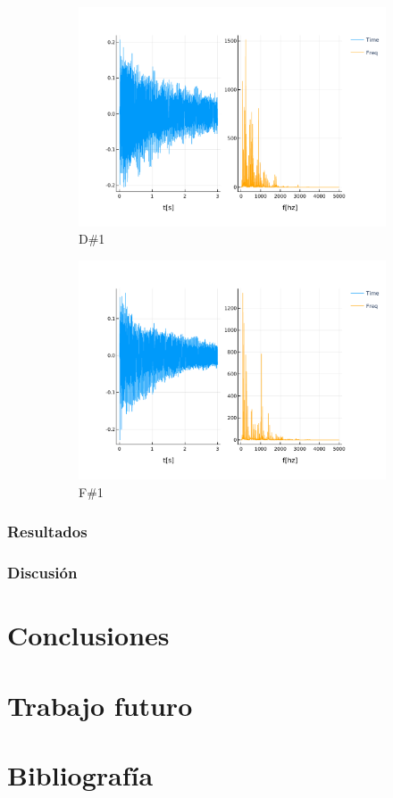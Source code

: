 \documentclass[12pt]{article}
\begin{document}
\begin{figure}[!ht]
	\centering
	\begin{subfigure}{.5\textwidth}
		\centering
		\includegraphics[width=1.0\linewidth]{assets/D1_sos.pdf}
		\caption{D\#1}
		\label{fig:d1_sos}
	\end{subfigure}%
	\begin{subfigure}{.5\textwidth}
		\centering
		\includegraphics[width=1.0\linewidth]{assets/F1_sos.pdf}
		\caption{F\#1}
		\label{fig:f1_sos}
	\end{subfigure}
	\caption{}
\end{figure}

\newpage
\subsubsection{Resultados}
\subsubsection{Discusión}


\newpage
\section{Conclusiones}
\label{Conclusiones}

\section{Trabajo futuro}
\label{Trabajo futuro}

\section{Bibliografía}
\label{Bibliografía}
\printbibliography
\end{document}
